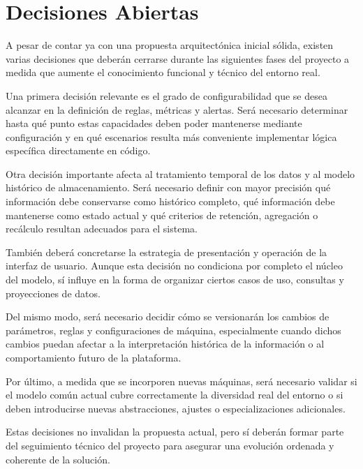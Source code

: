 \section{Decisiones Abiertas}

A pesar de contar ya con una propuesta arquitectónica inicial sólida, existen varias decisiones que deberán cerrarse durante las siguientes fases del proyecto a medida que aumente el conocimiento funcional y técnico del entorno real.

Una primera decisión relevante es el grado de configurabilidad que se desea alcanzar en la definición de reglas, métricas y alertas. Será necesario determinar hasta qué punto estas capacidades deben poder mantenerse mediante configuración y en qué escenarios resulta más conveniente implementar lógica específica directamente en código.

Otra decisión importante afecta al tratamiento temporal de los datos y al modelo histórico de almacenamiento. Será necesario definir con mayor precisión qué información debe conservarse como histórico completo, qué información debe mantenerse como estado actual y qué criterios de retención, agregación o recálculo resultan adecuados para el sistema.

También deberá concretarse la estrategia de presentación y operación de la interfaz de usuario. Aunque esta decisión no condiciona por completo el núcleo del modelo, sí influye en la forma de organizar ciertos casos de uso, consultas y proyecciones de datos.

Del mismo modo, será necesario decidir cómo se versionarán los cambios de parámetros, reglas y configuraciones de máquina, especialmente cuando dichos cambios puedan afectar a la interpretación histórica de la información o al comportamiento futuro de la plataforma.

Por último, a medida que se incorporen nuevas máquinas, será necesario validar si el modelo común actual cubre correctamente la diversidad real del entorno o si deben introducirse nuevas abstracciones, ajustes o especializaciones adicionales.

Estas decisiones no invalidan la propuesta actual, pero sí deberán formar parte del seguimiento técnico del proyecto para asegurar una evolución ordenada y coherente de la solución.
